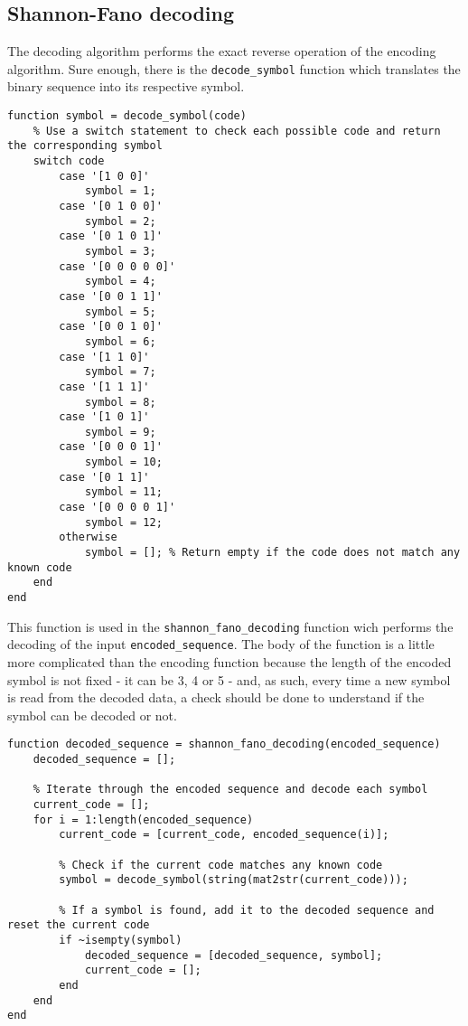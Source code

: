 \subsection{Shannon-Fano decoding}
The decoding algorithm performs the exact reverse operation of the encoding algorithm. Sure enough, there is the \texttt{decode\_symbol} function which translates the binary sequence into its respective symbol.
\begin{lstlisting}
function symbol = decode_symbol(code)
    % Use a switch statement to check each possible code and return the corresponding symbol
    switch code
        case '[1 0 0]'
            symbol = 1;
        case '[0 1 0 0]'
            symbol = 2;
        case '[0 1 0 1]'
            symbol = 3;
        case '[0 0 0 0 0]'
            symbol = 4;
        case '[0 0 1 1]'
            symbol = 5;
        case '[0 0 1 0]'
            symbol = 6;
        case '[1 1 0]'
            symbol = 7;
        case '[1 1 1]'
            symbol = 8;
        case '[1 0 1]'
            symbol = 9;
        case '[0 0 0 1]'
            symbol = 10;
        case '[0 1 1]'
            symbol = 11;
        case '[0 0 0 0 1]'
            symbol = 12;
        otherwise
            symbol = []; % Return empty if the code does not match any known code
    end
end
\end{lstlisting}

\noindent This function is used in the \texttt{shannon\_fano\_decoding} function wich performs the decoding of the input \texttt{encoded\_sequence}. The body of the function is a little more complicated than the encoding function because the length of the encoded symbol is not fixed - it can be 3, 4 or 5 - and, as such, every time a new symbol is read from the decoded data, a check should be done to understand if the symbol can be decoded or not. 

\begin{lstlisting}
function decoded_sequence = shannon_fano_decoding(encoded_sequence)
    decoded_sequence = [];
    
    % Iterate through the encoded sequence and decode each symbol
    current_code = [];
    for i = 1:length(encoded_sequence)
        current_code = [current_code, encoded_sequence(i)];
        
        % Check if the current code matches any known code
        symbol = decode_symbol(string(mat2str(current_code)));
        
        % If a symbol is found, add it to the decoded sequence and reset the current code
        if ~isempty(symbol)
            decoded_sequence = [decoded_sequence, symbol];
            current_code = [];
        end
    end
end
\end{lstlisting}

